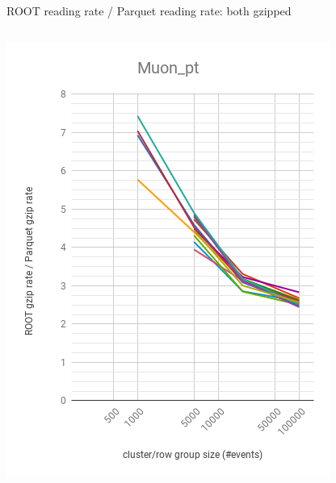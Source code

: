 \documentclass[aspectratio=169]{beamer}
\begin{document}
\begin{frame}{ROOT reading rate / Parquet reading rate: both gzipped}
\vspace{-0.15 cm}

\begin{columns}
\begin{center}
\includegraphics[width=\linewidth]{root-gzip-parquet-gzip-Muon_pt.png}
\end{center}
\begin{center}

\end{center}
\end{columns}
\end{frame}
\end{document}
